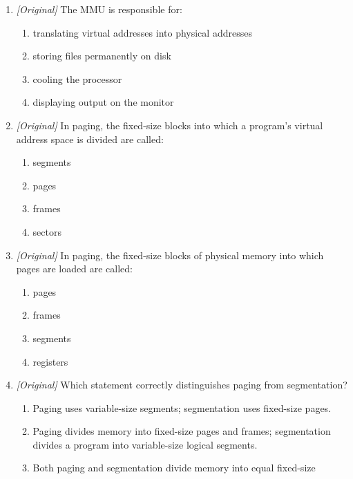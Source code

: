 \begin{enumerate}[label=\textbf{Q\arabic*.}, leftmargin=*]
  \begin{enumerate}[label=\Alph*.]
    \item Memory Management Unit
    \item Main Memory Utility
    \item Multiprocessor Memory Unit
    \item Machine Mapping Unit
  \end{enumerate}
\item \textit{[Original]} The MMU is responsible for:
  \begin{enumerate}[label=\Alph*.]
    \item translating virtual addresses into physical addresses
    \item storing files permanently on disk
    \item cooling the processor
    \item displaying output on the monitor
  \end{enumerate}
\item \textit{[Original]} In paging, the fixed-size blocks into which a
  program's virtual address space is divided are called:
  \begin{enumerate}[label=\Alph*.]
    \item segments
    \item pages
    \item frames
    \item sectors
  \end{enumerate}
\item \textit{[Original]} In paging, the fixed-size blocks of physical memory
  into which pages are loaded are called:
  \begin{enumerate}[label=\Alph*.]
    \item pages
    \item frames
    \item segments
    \item registers
  \end{enumerate}
\item \textit{[Original]} Which statement correctly distinguishes paging from
  segmentation?
  \begin{enumerate}[label=\Alph*.]
    \item Paging uses variable-size segments; segmentation uses fixed-size
      pages.
    \item Paging divides memory into fixed-size pages and frames; segmentation
      divides a program into variable-size logical segments.
    \item Both paging and segmentation divide memory into equal fixed-size

\end{enumerate}
\end{enumerate}
